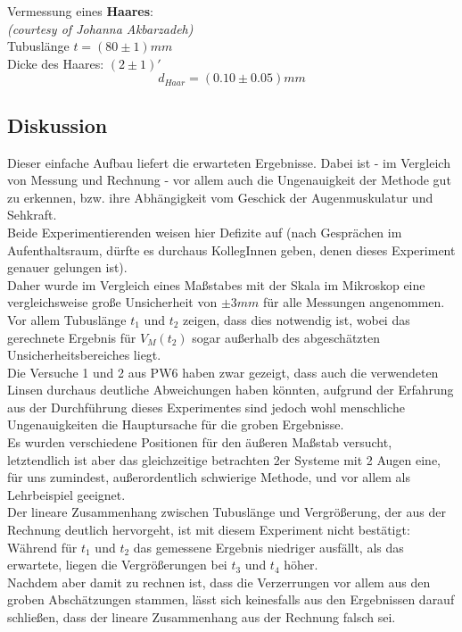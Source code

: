 \documentclass[12pt,a4paper]{article}
\begin{document}
\begin{multicols}{2}
\begin{itemize}
	
\end{itemize}

\noindent Vermessung eines \textbf{Haares}:\\
\textit{(courtesy of Johanna Akbarzadeh)}\\
Tubuslänge $t= (80 \pm 1)mm$\\
Dicke des Haares: $(2 \pm 1)'$\\
$$d_{Haar} = (0.10 \pm 0.05)mm$$



\subsection{Diskussion}

Dieser einfache Aufbau liefert die erwarteten Ergebnisse. Dabei ist - im Vergleich von Messung und Rechnung - vor allem auch die Ungenauigkeit der Methode gut zu erkennen, bzw. ihre Abhängigkeit vom Geschick der Augenmuskulatur und Sehkraft.\\
Beide Experimentierenden weisen hier Defizite auf (nach Gesprächen im Aufenthaltsraum, dürfte es durchaus KollegInnen geben, denen dieses Experiment genauer gelungen ist).\\
Daher wurde im Vergleich eines Maßstabes mit der Skala im Mikroskop eine vergleichsweise große Unsicherheit von $\pm 3mm$ für alle Messungen angenommen. Vor allem Tubuslänge $t_1$ und $t_2$ zeigen, dass dies notwendig ist, wobei das gerechnete Ergebnis für  $V_M(t_2)$ sogar außerhalb des abgeschätzten Unsicherheitsbereiches liegt.\\
Die Versuche 1 und 2 aus PW6 haben zwar gezeigt, dass auch die verwendeten Linsen durchaus deutliche Abweichungen haben könnten, aufgrund der Erfahrung aus der Durchführung dieses Experimentes sind jedoch wohl menschliche Ungenauigkeiten die Hauptursache für die groben Ergebnisse.\\
Es wurden verschiedene Positionen für den äußeren Maßstab versucht, letztendlich ist aber das gleichzeitige betrachten 2er Systeme mit 2 Augen eine, für uns zumindest, außerordentlich schwierige Methode, und vor allem als Lehrbeispiel geeignet.\\
Der lineare Zusammenhang zwischen Tubuslänge und Vergrößerung, der aus der Rechnung deutlich hervorgeht, ist mit diesem Experiment nicht bestätigt: Während für $t_1$ und $t_2$ das gemessene Ergebnis niedriger ausfällt, als das erwartete, liegen die Vergrößerungen bei $t_3$ und $t_4$ höher.\\
Nachdem aber damit zu rechnen ist, dass die Verzerrungen vor allem aus den groben Abschätzungen stammen, lässt sich keinesfalls aus den Ergebnissen darauf schließen, dass der lineare Zusammenhang aus der Rechnung falsch sei.\\

\end{multicols}
\end{document}
